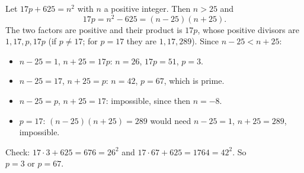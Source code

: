 Let $17p+625=n^2$ with $n$ a positive integer. Then $n>25$ and
\[17p=n^2-625=(n-25)(n+25).\]
The two factors are positive and their product is $17p$, whose positive divisors are $1,17,p,17p$ (if $p\ne17$; for $p=17$ they are $1,17,289$). Since $n-25<n+25$:
\begin{itemize}
\item $n-25=1$, $n+25=17p$: $n=26$, $17p=51$, $p=3$.
\item $n-25=17$, $n+25=p$: $n=42$, $p=67$, which is prime.
\item $n-25=p$, $n+25=17$: impossible, since then $n=-8$.
\item $p=17$: $(n-25)(n+25)=289$ would need $n-25=1$, $n+25=289$, impossible.
\end{itemize}
Check: $17\cdot3+625=676=26^2$ and $17\cdot67+625=1764=42^2$. So $\boxed{p=3\text{ or }p=67}$.

